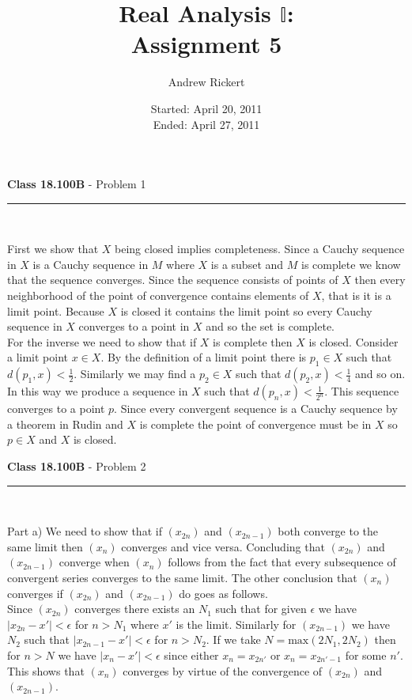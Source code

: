 \documentclass[11pt,reqno]{article}
\title{Real Analysis $\mathbb{I}$: \\ Assignment 5}
\author{Andrew Rickert}
\date{Started: April 20, 2011 \\ \hspace{1pt} Ended: April 27,  2011}                                           %
\begin{document}
\maketitle


\begin{flushleft} 
\textbf{Class 18.100B} - Problem 1\\
\rule{500pt}{1pt}\\
\end{flushleft} 

First we show that $X$ being closed implies completeness. Since a Cauchy sequence in $X$ is a Cauchy sequence in $M$ where $X$ is a subset and $M$ is complete we know that the sequence converges. Since the sequence consists of points of $X$ then every neighborhood of the point of convergence contains elements of $X$, that is it is a limit point. Because $X$ is closed it contains the limit point so every Cauchy sequence in $X$ converges to a point in $X$ and so the set is complete.\\
\indent For the inverse we need to show that if $X$ is complete then $X$ is closed. Consider a limit point $x \in X$. By the definition of a limit point there is $p_1 \in X$ such that $d(p_1,x) < \frac{1}{2}$. Similarly we may find a $p_2 \in X$ such that $d(p_2,x) < \frac{1}{4}$ and so on. In this way we produce a sequence in $X$ such that $d(p_n,x) < \frac{1}{2^n}$. This sequence converges to a point $p$. Since every convergent sequence is a Cauchy sequence by a theorem in Rudin and $X$ is complete the point of convergence must be in $X$ so $p \in X$ and $X$ is closed.

\vspace{15pt}
\begin{flushleft} 
\textbf{Class 18.100B} - Problem 2\\
\rule{500pt}{1pt}\\
\end{flushleft} 

\noindent Part a) We need to show that if $(x_{2n})$ and $(x_{2n-1})$ both converge to the same limit then $(x_n)$ converges and vice versa. Concluding that $(x_{2n})$ and $(x_{2n-1})$ converge when $(x_n)$ follows from the fact that every subsequence of convergent series converges to the same limit. The other conclusion that $(x_n)$ converges if $(x_{2n})$ and $(x_{2n-1})$ do goes as follows.\\
\indent Since $(x_{2n})$ converges there exists an $N_1$ such that for given $\epsilon$ we have $|x_{2n}-x'| < \epsilon$ for $n > N_1$ where $x'$ is the limit. Similarly for $(x_{2n-1})$ we have $N_2$ such that  $|x_{2n-1}-x'| < \epsilon$ for $n > N_2$. If we take $N = \text{max} (2N_1,2N_2)$ then for $n > N$ we have $|x_n -x'| < \epsilon$ since either $x_n = x_{2n'}$ or $x_n = x_{2n'-1}$ for some $n'$. This shows that $(x_n)$ converges by virtue of the convergence of $(x_{2n})$ and $(x_{2n-1})$.\\
\end{document}
